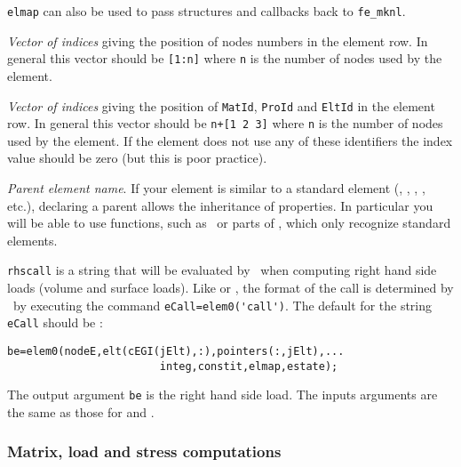 {\tt elmap} can also be used to pass structures and callbacks back to {\tt fe\_mknl}. 


{\sl Vector of indices} giving the position of nodes numbers in the element row. In general this vector should be {\tt [1:n]} where {\tt n} is the number of nodes used by the element.



{\sl Vector of indices} giving the position of {\tt MatId}, {\tt ProId} and {\tt EltId} in the element row. In general this vector should be {\tt n+[1 2 3]} where {\tt n} is the number of nodes used by the element. If the element does not use any of these identifiers the index value should be zero (but this is poor practice).



{\sl Parent element name}. If your element is similar to a standard element (\beam, \triaa, \quada, \hexah, etc.), declaring a parent allows the inheritance of properties. In particular you will be able to use functions, such as \feload\  or parts of \femesh, which only recognize standard elements.


{\tt rhscall} is a string that will be evaluated by \feload\ when computing right hand side loads (volume and surface loads). Like  or , the format of the call is determined by \feload\ by executing the command \verb+eCall=elem0('call')+. The default for the string {\tt eCall} should be : 

\begin{verbatim}
be=elem0(nodeE,elt(cEGI(jElt),:),pointers(:,jElt),...
                        integ,constit,elmap,estate);
\end{verbatim}

The output argument {\tt be} is the right hand side load. The inputs arguments are the same as those for  and .


\subsubsection{Matrix, load and stress computations}

